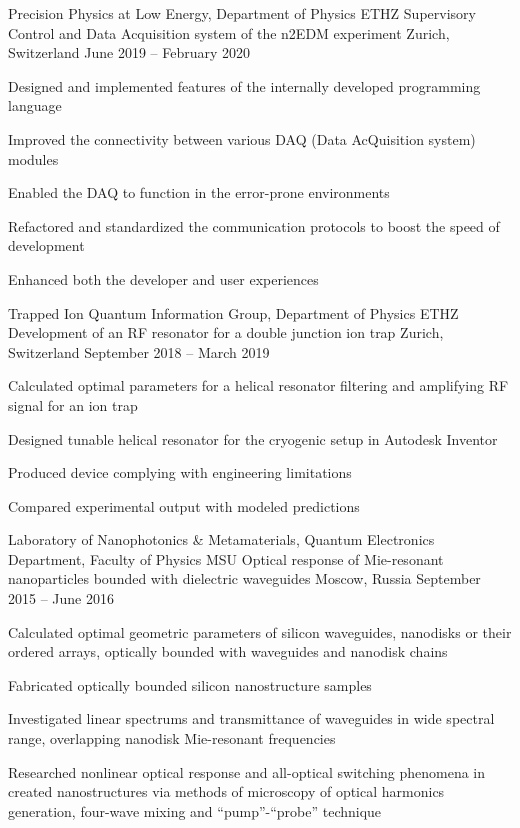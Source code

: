 \begin{cventries}
	\cventry
		{Precision Physics at Low Energy, Department of Physics ETHZ}
		{Supervisory Control and Data Acquisition system of the n2EDM experiment}
		{Zurich, Switzerland}
		{June 2019 -- February 2020}
		{
			\begin{cvitems}
				\item {Designed and implemented features of the internally developed programming language}
				\item {Improved the connectivity between various DAQ (Data AcQuisition system) modules}
				\item {Enabled the DAQ to function in the error-prone environments}
				\item {Refactored and standardized the communication protocols to boost the speed of development}
				\item {Enhanced both the developer and user experiences}
			\end{cvitems}
		}

	\cventry
		{Trapped Ion Quantum Information Group, Department of Physics ETHZ}
		{Development of an RF resonator for a double junction ion trap}
		{Zurich, Switzerland}
		{September 2018 -- March 2019}
		{
			\begin{cvitems}
				\item {Calculated optimal parameters for a helical resonator filtering and amplifying RF signal for an ion trap}
				\item {Designed tunable helical resonator for the cryogenic setup in Autodesk Inventor}
				\item {Produced device complying with engineering limitations}
				\item {Compared experimental output with modeled predictions}
			\end{cvitems}
		}

	\cventry
		{Laboratory of Nanophotonics \& Metamaterials, Quantum Electronics Department, Faculty of Physics MSU}
		{Optical response of Mie-resonant nanoparticles bounded with dielectric waveguides}
		{Moscow, Russia}
		{September 2015 -- June 2016}
		{
			\begin{cvitems}
				\item {Calculated optimal geometric parameters of silicon waveguides, nanodisks or their ordered arrays, optically bounded with waveguides and nanodisk chains }
				\item {Fabricated optically bounded silicon nanostructure samples}
				\item {Investigated linear spectrums and transmittance of waveguides in wide spectral range, overlapping nanodisk Mie-resonant frequencies}
				\item {Researched nonlinear optical response and all-optical switching phenomena in created nanostructures via methods of microscopy of optical harmonics generation, four-wave mixing and ``pump''-``probe'' technique}
			\end{cvitems}
		}


\end{cventries}
